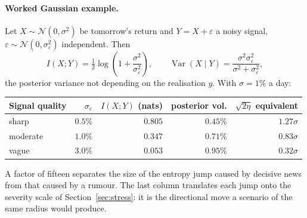 \paragraph{Worked Gaussian example.} Let $X\sim\mathcal N(0,\sigma^2)$ be
tomorrow's return and $Y=X+\varepsilon$ a noisy signal,
$\varepsilon\sim\mathcal N(0,\sigma_\varepsilon^2)$ independent. Then
\begin{equation}
\label{eq:mi-gauss}
I(X;Y)=\tfrac12\log\!\left(1+\frac{\sigma^2}{\sigma_\varepsilon^2}\right),
\qquad
\operatorname{Var}(X\mid Y)=\frac{\sigma^2\sigma_\varepsilon^2}{\sigma^2+\sigma_\varepsilon^2},
\end{equation}
the posterior variance not depending on the realisation $y$. With
$\sigma=1\%$ a day:

\begin{center}
\small
\begin{tabular}{@{}lrrrr@{}}
\toprule
Signal quality & $\sigma_\varepsilon$ & $I(X;Y)$ (nats) & posterior vol. & $\sqrt{2\eta}$ equivalent \\
\midrule
sharp    & $0.5\%$ & $0.805$ & $0.45\%$ & $1.27\sigma$ \\
moderate & $1.0\%$ & $0.347$ & $0.71\%$ & $0.83\sigma$ \\
vague    & $3.0\%$ & $0.053$ & $0.95\%$ & $0.32\sigma$ \\
\bottomrule
\end{tabular}
\end{center}

A factor of fifteen separates the size of the entropy jump caused by decisive
news from that caused by a rumour. The last column translates each jump onto the
severity scale of Section~\ref{sec:stress}: it is the directional move a
scenario of the same radius would produce.
